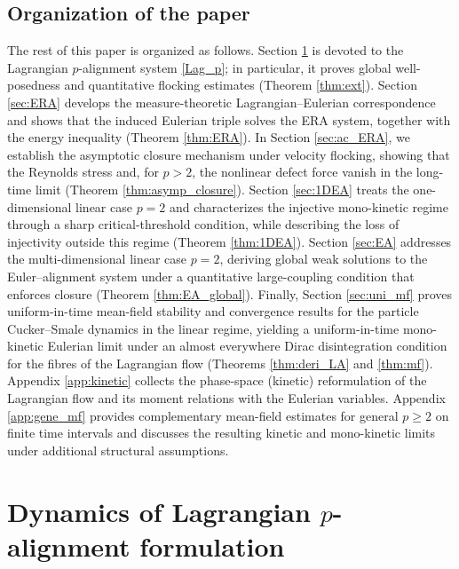 \documentclass[10pt,reqno]{amsart}
\renewcommand{\ge}{\geqslant}
\numberwithin{equation}{section}
\begin{document}
\subsection{Organization of the paper}
The rest of this paper is organized as follows. Section \ref{sec:LA} is devoted to the Lagrangian $p$-alignment system \eqref{Lag_p}; in particular, it proves global well-posedness and quantitative flocking estimates (Theorem \ref{thm:ext}). Section \ref{sec:ERA} develops the measure-theoretic Lagrangian--Eulerian correspondence and shows that the induced Eulerian triple solves the ERA system, together with the energy inequality (Theorem \ref{thm:ERA}). In Section \ref{sec:ac_ERA}, we establish the asymptotic closure mechanism under velocity flocking, showing that the Reynolds stress and, for $p>2$, the nonlinear defect force vanish in the long-time limit (Theorem \ref{thm:asymp_closure}). Section \ref{sec:1DEA} treats the one-dimensional linear case $p=2$ and characterizes the injective mono-kinetic regime through a sharp critical-threshold condition, while describing the loss of injectivity outside this regime (Theorem \ref{thm:1DEA}). Section \ref{sec:EA} addresses the multi-dimensional linear case $p=2$, deriving global weak solutions to the Euler--alignment system under a quantitative large-coupling condition that enforces closure (Theorem \ref{thm:EA_global}). Finally, Section \ref{sec:uni_mf} proves uniform-in-time mean-field stability and convergence results for the particle Cucker--Smale dynamics in the linear regime, yielding a uniform-in-time mono-kinetic Eulerian limit under an almost everywhere Dirac disintegration condition for the fibres of the Lagrangian flow (Theorems \ref{thm:deri_LA} and \ref{thm:mf}). Appendix \ref{app:kinetic} collects the phase-space (kinetic) reformulation of the Lagrangian flow and its moment relations with the Eulerian variables. Appendix \ref{app:gene_mf} provides complementary mean-field estimates for general $p\ge2$ on finite time intervals and discusses the resulting kinetic and mono-kinetic limits under additional structural assumptions.

%
%
%                      
%
%
 


 \section{Dynamics of Lagrangian $p$-alignment formulation}\label{sec:LA}
 
\end{document}
